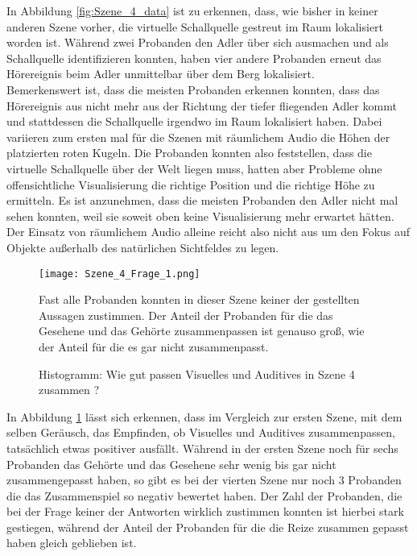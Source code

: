 In Abbildung \ref{fig:Szene_4_data} ist zu erkennen, dass, wie bisher in keiner anderen Szene vorher, die virtuelle Schallquelle gestreut im Raum lokalisiert worden ist. Während zwei Probanden den Adler über sich ausmachen und als Schallquelle identifizieren konnten, haben vier andere Probanden erneut das Hörereignis beim Adler unmittelbar über dem Berg lokalisiert. \\

Bemerkenswert ist, dass die meisten Probanden erkennen konnten, dass das Hörereignis aus nicht mehr aus der Richtung der tiefer fliegenden Adler kommt und stattdessen die Schallquelle irgendwo im Raum lokalisiert haben. Dabei variieren zum ersten mal für die Szenen mit räumlichem Audio die Höhen der platzierten roten Kugeln. Die Probanden konnten also feststellen, dass die virtuelle Schallquelle über der Welt liegen muss, hatten aber Probleme ohne offensichtliche Visualisierung die richtige Position und die richtige Höhe zu ermitteln. Es ist anzunehmen, dass die meisten Probanden den Adler nicht mal sehen konnten, weil sie soweit oben keine Visualisierung mehr erwartet hätten. Der Einsatz von räumlichem Audio alleine reicht also nicht aus um den Fokus auf Objekte außerhalb des natürlichen Sichtfeldes zu legen. 
\vspace*{30pt}
   \begin{figure}[H]
\centering
\texttt{[image: Szene\_4\_Frage\_1.png]}
\caption{Histogramm: Wie gut passen Visuelles und Auditives in Szene 4 zusammen ?}
Fast alle Probanden konnten in dieser Szene keiner der gestellten Aussagen zustimmen. Der Anteil der Probanden für die das Gesehene und das Gehörte zusammenpassen ist genauso groß, wie der Anteil für die es gar nicht zusammenpasst.
\label{fig:Szene_4_Frage1}
\end{figure} 
\newpage
In Abbildung \ref{fig:Szene_4_Frage1} lässt sich erkennen, dass im Vergleich zur ersten Szene, mit dem selben Geräusch, das Empfinden, ob Visuelles und Auditives zusammenpassen, tatsächlich etwas positiver ausfällt. Während in der ersten Szene noch für sechs Probanden das Gehörte und das Gesehene sehr wenig bis gar nicht zusammengepasst haben, so gibt es bei der vierten Szene  nur noch 3 Probanden die das Zusammenspiel so negativ bewertet haben. Der Zahl der Probanden, die bei der Frage keiner der Antworten wirklich zustimmen konnten ist hierbei stark gestiegen, während der Anteil der Probanden für die die Reize zusammen gepasst haben gleich geblieben ist. \\ 

